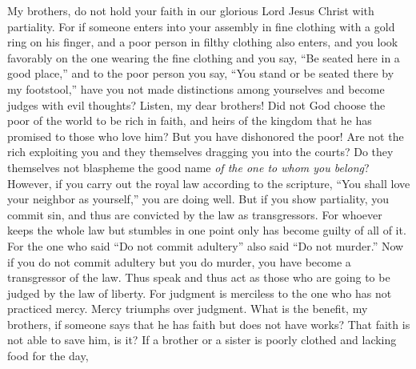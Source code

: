 \begin{biblechapter} %
 My brothers, do not hold your faith in our glorious Lord Jesus Christ with partiality.
\verse For if someone enters into your assembly in fine clothing with a gold ring on his finger, and a poor person in filthy clothing also enters,
\verse and you look favorably on the one wearing the fine clothing and you say, “Be seated here in a good place,” and to the poor person you say, “You stand or be seated there by my footstool,”
\verse have you not made distinctions among yourselves and become judges with evil thoughts?
\verse Listen, my dear brothers! Did not God choose the poor of the world to be rich in faith, and heirs of the kingdom that he has promised to those who love him?
\verse But you have dishonored the poor! Are not the rich exploiting you and they themselves dragging you into the courts?
\verse Do they themselves not blaspheme the good name \textit{of the one to whom you belong}?
\verse However, if you carry out the royal law according to the scripture, “You shall love your neighbor as yourself,” you are doing well.
\verse But if you show partiality, you commit sin, and thus are convicted by the law as transgressors.
\verse For whoever keeps the whole law but stumbles in one point only has become guilty of all of it.
\verse For the one who said “Do not commit adultery” also said “Do not murder.” Now if you do not commit adultery but you do murder, you have become a transgressor of the law.
\verse Thus speak and thus act as those who are going to be judged by the law of liberty.
\verse For judgment is merciless to the one who has not practiced mercy. Mercy triumphs over judgment.
 What is the benefit, my brothers, if someone says that he has faith but does not have works? That faith is not able to save him, is it?
\verse If a brother or a sister is poorly clothed and lacking food for the day,

\end{biblechapter}
